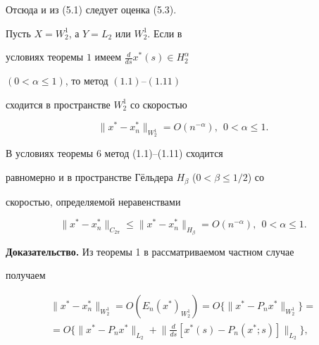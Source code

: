 Отсюда и из (5.1) следует оценка (5.3).





\begin{thm}


Пусть $X=W_2^1$, а $Y=L_2$ или $W_2^1$. Если в


условиях теоремы $1$ имеем $\frac{d}{ds}x^*(s) \in H_2^\alpha$


$(0 < \alpha \le 1)$, то метод $(1.1)$--$(1.11)$


сходится в пространстве $W_2^1$ со скоростью


\begin{equation}


\|x^*-x^*_n\|_{W_2^1}=O(n^{-\alpha}), \ \


0 < \alpha \le 1.


\end{equation}


\end{thm}





\begin{cornonum}


В условиях теоремы 6 метод (1.1)--(1.11) сходится


равномерно и в пространстве Г\"ельдера $H_\beta$ ($0 < \beta \le 1/2$) со


скоростью, определяемой неравенствами


\begin{equation}


\|x^*-x^*_n\|_{C_{2\pi}} \le \|x^*-x^*_n\|_{H_\beta}


=O(n^{-\alpha}),\ \ 0<\alpha \le 1.


\end{equation}


\end{cornonum}





{\bf Доказательство.} Из теоремы 1 в рассматриваемом частном случае


получаем


\begin{multline}


\|x^*-x^*_n\|_{W_2^1}=O(E_n(x^*)_{W_2^1})=


O\{\|x^*-P_nx^*\|_{W_2^1}\}=\\


=O\bigg\{\|x^*-P_nx^*\|_{L_2}


+\bigg\|\frac{d}{ds}[x^*(s)-P_n(x^*;s)]\bigg\|_{L_2}\bigg\},


\end{multline}



